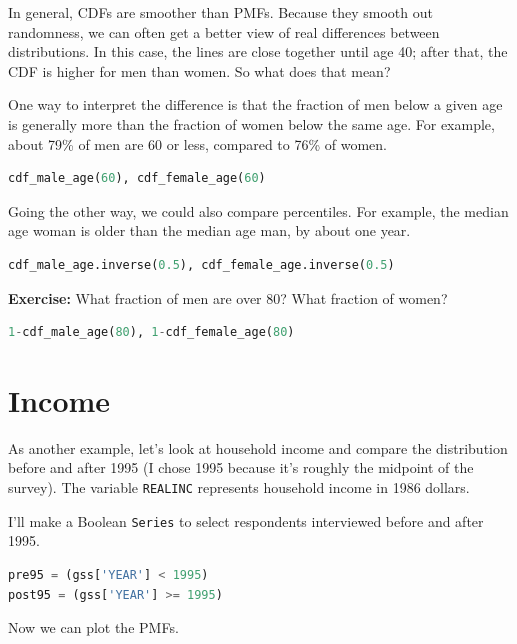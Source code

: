 In general, CDFs are smoother than PMFs. Because they smooth out
randomness, we can often get a better view of real differences between
distributions. In this case, the lines are close together until age 40;
after that, the CDF is higher for men than women. So what does that
mean?

One way to interpret the difference is that the fraction of men below a
given age is generally more than the fraction of women below the same
age. For example, about 79\% of men are 60 or less, compared to 76\% of
women.

\begin{lstlisting}[language=Python,style=source]
cdf_male_age(60), cdf_female_age(60)
\end{lstlisting}

Going the other way, we could also compare percentiles. For example, the
median age woman is older than the median age man, by about one year.

\begin{lstlisting}[language=Python,style=source]
cdf_male_age.inverse(0.5), cdf_female_age.inverse(0.5)
\end{lstlisting}

\textbf{Exercise:} What fraction of men are over 80? What fraction of
women?

\begin{lstlisting}[language=Python,style=source]
1-cdf_male_age(80), 1-cdf_female_age(80)
\end{lstlisting}

\hypertarget{income}{%
\section{Income}\label{income}}

As another example, let's look at household income and compare the
distribution before and after 1995 (I chose 1995 because it's roughly
the midpoint of the survey). The variable
\passthrough{\lstinline!REALINC!} represents household income in 1986
dollars.

I'll make a Boolean \passthrough{\lstinline!Series!} to select
respondents interviewed before and after 1995.

\begin{lstlisting}[language=Python,style=source]
pre95 = (gss['YEAR'] < 1995)
post95 = (gss['YEAR'] >= 1995)
\end{lstlisting}

Now we can plot the PMFs.

